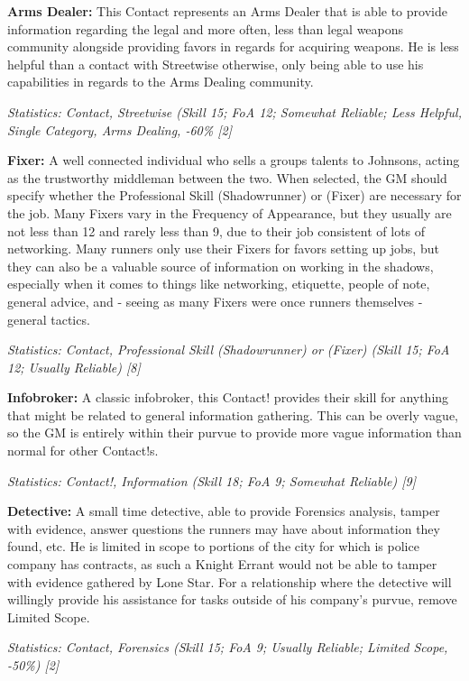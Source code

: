 \begin{multicols*}{2}
	\textbf{Arms Dealer:} This Contact represents an Arms Dealer that is able to provide information regarding the legal and more often, less than legal weapons community alongside providing favors in regards for acquiring weapons. He is less helpful than a contact with Streetwise otherwise, only being able to use his capabilities in regards to the Arms Dealing community.
	
	\textit{\textcolor{OliveGreen}{Statistics: Contact, Streetwise (Skill 15; FoA 12; Somewhat Reliable; Less Helpful, Single Category, Arms Dealing, -60\% [2]}}
	
	\textbf{Fixer:} A well connected individual who sells a groups talents to Johnsons, acting as the trustworthy middleman between the two. When selected, the GM should specify whether the Professional Skill (Shadowrunner) or (Fixer) are necessary for the job. Many Fixers vary in the Frequency of Appearance, but they usually are not less than 12 and rarely less than 9, due to their job consistent of lots of networking. Many runners only use their Fixers for favors setting up jobs, but they can also be a valuable source of information on working in the shadows, especially when it comes to things like networking, etiquette, people of note, general advice, and - seeing as many Fixers were once runners themselves - general tactics.
	
	\textit{\textcolor{OliveGreen}{Statistics: Contact, Professional Skill (Shadowrunner) or (Fixer) (Skill 15; FoA 12; Usually Reliable) [8]}}
	
	\textbf{Infobroker:} A classic infobroker, this Contact! provides their skill for anything that might be related to general information gathering. This can be overly vague, so the GM is entirely within their purvue to provide more vague information than normal for other Contact!s.
	
	\textit{\textcolor{OliveGreen}{Statistics: Contact!, Information (Skill 18; FoA 9; Somewhat Reliable) [9]}}
	
	\textbf{Detective:} A small time detective, able to provide Forensics analysis, tamper with evidence, answer questions the runners may have about information they found, etc. He is limited in scope to portions of the city for which is police company has contracts, as such a Knight Errant would not be able to tamper with evidence gathered by Lone Star. For a relationship where the detective will willingly provide his assistance for tasks outside of his company's purvue, remove Limited Scope.
	
	\textit{\textcolor{OliveGreen}{Statistics: Contact, Forensics (Skill 15; FoA 9; Usually Reliable; Limited Scope, -50\%) [2]}}
	

\end{multicols*}

